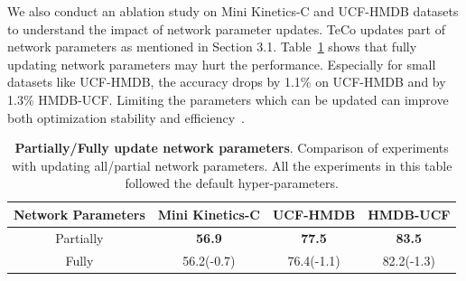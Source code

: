 \documentclass{article} %
\begin{document}
We also conduct an ablation study on Mini Kinetics-C and UCF-HMDB datasets to understand the impact of network parameter updates. TeCo updates part of network parameters as mentioned in Section 3.1. Table~\ref{param-table} shows that fully updating network parameters may hurt the performance. Especially for small datasets like UCF-HMDB, the accuracy drops by 1.1\% on UCF-HMDB and by 1.3\% HMDB-UCF. Limiting the parameters which can be updated can improve both optimization stability and efficiency~\citep{wang2020tent}.
\begin{table}[h]
\caption{\textbf{Partially/Fully update network parameters}. 
Comparison of experiments with updating all/partial network parameters. All the experiments in this table followed the default hyper-parameters.
}
\label{param-table}
\begin{center}
\begin{tabular}{c|c c c}
\toprule
Network Parameters & Mini Kinetics-C & UCF-HMDB &HMDB-UCF  \\
\midrule
Partially & \textbf{56.9} & \textbf{77.5} & \textbf{83.5}\\
Fully & 56.2(-0.7) & 76.4(-1.1) & 82.2(-1.3)\\

\bottomrule
\end{tabular}
\end{center}
\hfill

\end{table}
\end{document}
